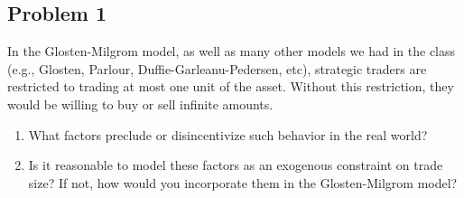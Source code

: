 \ifexam

\subsection*{Problem 1}

In the Glosten-Milgrom model, as well as many other models we had in the class (e.g., Glosten, Parlour, Duffie-Garleanu-Pedersen, etc), strategic traders are restricted to trading at most one unit of the asset. Without this restriction, they would be willing to buy or sell infinite amounts.

\begin{enumerate}%
	\item What factors preclude or disincentivize such behavior in the real world?
	\item Is it reasonable to model these factors as an exogenous constraint on trade size? If not, how would you incorporate them in the Glosten-Milgrom model?
\end{enumerate}


